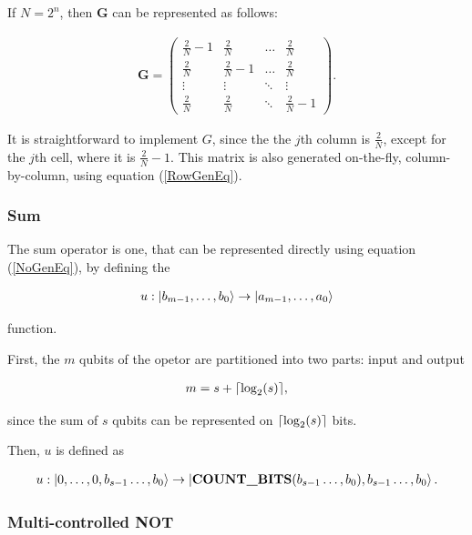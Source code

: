 If $N = 2^n$, then $\mathbf{G}$ can be represented as follows:

\begin{align*}
  \mathbf{G} = \begin{pmatrix}
      \frac{2}{N} - 1 & \frac{2}{N} & \dots  & \frac{2}{N} \\
      \frac{2}{N} & \frac{2}{N} - 1 & \dots  & \frac{2}{N} \\
      \vdots & \vdots & \ddots & \vdots \\
      \frac{2}{N} & \frac{2}{N} & \ddots & \frac{2}{N} - 1
    \end{pmatrix}.
\end{align*}

It is straightforward to implement $G$, since the the $j$th column is $\frac{2}{N}$, except for the $j$th cell, where it is $\frac{2}{N}-1$. This matrix is also generated on-the-fly, column-by-column, using equation (\ref{RowGenEq}).

\subsubsection{Sum}

The sum operator is one, that can be represented directly using equation (\ref{NoGenEq}), by defining the

\begin{align*}
    u: \ket{b_{m-1},\dots{},b_0} \rightarrow \ket{a_{m-1},\dots{},a_0}
\end{align*}

function.

First, the $m$ qubits of the opetor are partitioned into two parts: input and output

\begin{align*}
m = s + \lceil\log_{2}(s)\rceil,
\end{align*}

since the sum of $s$ qubits can be represented on $\lceil\log_{2}(s)\rceil$ bits.

Then, $u$ is defined as 

\begin{align*}
    u: \ket{0,\dots{},0,b_{s-1}\dots{},b_0} \rightarrow \ket{\text{\textbf{COUNT\_BITS}}(b_{s-1}\dots{},b_0),b_{s-1}\dots{},b_0}.
\end{align*}

\subsubsection{Multi-controlled NOT}


